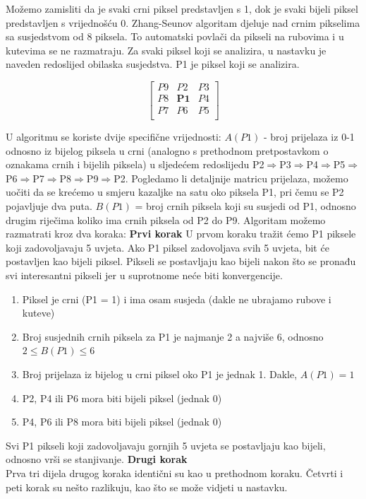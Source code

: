 \documentclass[times, utf8, diplomski]{fer}
\theoremstyle{definition}
\begin{document}
Možemo zamisliti da je svaki crni piksel predstavljen s 1, dok je svaki bijeli piksel predstavljen s vrijednošću 0. Zhang-Seunov algoritam djeluje nad crnim pikselima sa susjedstvom od 8 piksela. To automatski povlači da pikseli na rubovima i u kutevima se ne razmatraju. Za svaki piksel koji se analizira, u nastavku je naveden redoslijed obilaska susjedstva. P1 je piksel koji se analizira.

\[
\begin{bmatrix}
P9 & P2 & P3 \\
P8 & \textbf{P1} & P4 \\
P7 & P6 & P5 \\
\end{bmatrix}
\]

U algoritmu se koriste dvije specifične vrijednosti:\newline
$A(P1)$ - broj prijelaza iz 0-1 odnosno iz bijelog piksela u crni (analogno s prethodnom pretpostavkom o oznakama crnih i bijelih piksela) u sljedećem redoslijedu P2$\Rightarrow$P3$\Rightarrow$P4$\Rightarrow$P5$\Rightarrow$P6$\Rightarrow$P7$\Rightarrow$P8$\Rightarrow$P9$\Rightarrow$P2. Pogledamo li detaljnije matricu prijelaza, možemo uočiti da se krećemo u smjeru kazaljke na satu oko piksela P1, pri čemu se P2 pojavljuje dva puta.\newline
$B(P1)$ = broj crnih piksela koji su susjedi od P1, odnosno drugim riječima koliko ima crnih piksela od P2 do P9.
\newline
\newline
Algoritam možemo razmatrati kroz dva koraka:
\newline
\textbf{Prvi korak}
\newline
U prvom koraku tražit ćemo P1 piksele koji zadovoljavaju 5 uvjeta. Ako P1 piksel zadovoljava svih 5 uvjeta, bit će postavljen kao bijeli piksel. Pikseli se postavljaju kao bijeli nakon što se pronađu svi interesantni pikseli jer u suprotnome neće biti konvergencije.

\begin{enumerate}
\item Piksel je crni (P1 = 1) i ima osam susjeda (dakle ne ubrajamo rubove i kuteve)
\item Broj susjednih crnih piksela za P1 je najmanje 2 a najviše 6, odnosno $2\leq B(P1)\leq6$
\item Broj prijelaza iz bijelog u crni piksel oko P1 je jednak 1. Dakle, $A(P1) = 1$
\item P2, P4 ili P6 mora biti bijeli piksel (jednak 0)
\item P4, P6 ili P8 mora biti bijeli piksel (jednak 0)
\end{enumerate}
Svi P1 pikseli koji zadovoljavaju gornjih 5 uvjeta se postavljaju kao bijeli, odnosno vrši se stanjivanje.
\newline
\textbf{Drugi korak}
\\
Prva tri dijela drugog koraka identični su kao u prethodnom koraku. Četvrti i peti korak su nešto razlikuju, kao što se može vidjeti u nastavku.
\end{document}
